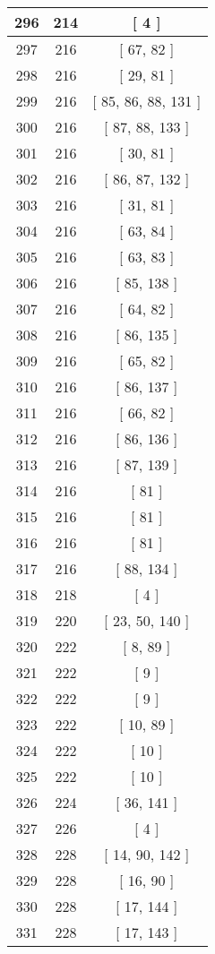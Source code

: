 \begin{center}
\begin{longtable}[H]{|| c c c ||}
\\\hline
296 & 214 & [ 4 ]
\\\hline
297 & 216 & [ 67, 82 ]
\\\hline
298 & 216 & [ 29, 81 ]
\\\hline
299 & 216 & [ 85, 86, 88, 131 ]
\\\hline
300 & 216 & [ 87, 88, 133 ]
\\\hline
301 & 216 & [ 30, 81 ]
\\\hline
302 & 216 & [ 86, 87, 132 ]
\\\hline
303 & 216 & [ 31, 81 ]
\\\hline
304 & 216 & [ 63, 84 ]
\\\hline
305 & 216 & [ 63, 83 ]
\\\hline
306 & 216 & [ 85, 138 ]
\\\hline
307 & 216 & [ 64, 82 ]
\\\hline
308 & 216 & [ 86, 135 ]
\\\hline
309 & 216 & [ 65, 82 ]
\\\hline
310 & 216 & [ 86, 137 ]
\\\hline
311 & 216 & [ 66, 82 ]
\\\hline
312 & 216 & [ 86, 136 ]
\\\hline
313 & 216 & [ 87, 139 ]
\\\hline
314 & 216 & [ 81 ]
\\\hline
315 & 216 & [ 81 ]
\\\hline
316 & 216 & [ 81 ]
\\\hline
317 & 216 & [ 88, 134 ]
\\\hline
318 & 218 & [ 4 ]
\\\hline
319 & 220 & [ 23, 50, 140 ]
\\\hline
320 & 222 & [ 8, 89 ]
\\\hline
321 & 222 & [ 9 ]
\\\hline
322 & 222 & [ 9 ]
\\\hline
323 & 222 & [ 10, 89 ]
\\\hline
324 & 222 & [ 10 ]
\\\hline
325 & 222 & [ 10 ]
\\\hline
326 & 224 & [ 36, 141 ]
\\\hline
327 & 226 & [ 4 ]
\\\hline
328 & 228 & [ 14, 90, 142 ]
\\\hline
329 & 228 & [ 16, 90 ]
\\\hline
330 & 228 & [ 17, 144 ]
\\\hline
331 & 228 & [ 17, 143 ]
\\\hline

\end{longtable}
\end{center}
